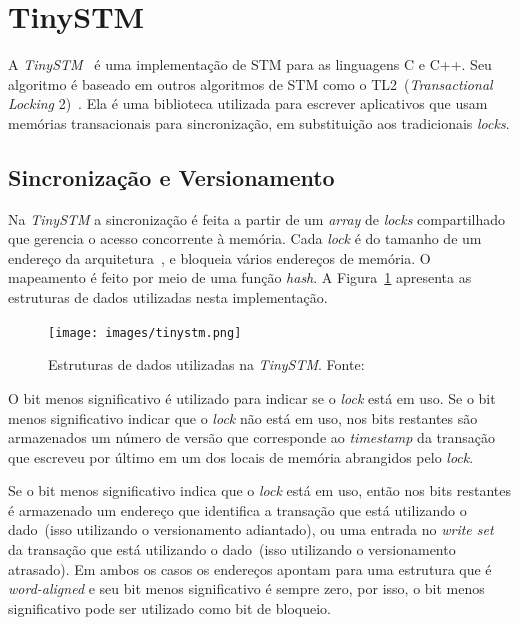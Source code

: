 \documentclass[diss,capa]{texufpel}
\begin{document}
\section{TinySTM}

A \emph{TinySTM}~\cite{TINY} é uma implementação de STM para as linguagens C e C++. Seu algoritmo é baseado em outros algoritmos de STM como o TL2~(\emph{Transactional Locking} 2)~\cite{tl2}. Ela é uma biblioteca utilizada para escrever aplicativos que usam memórias transacionais para sincronização, em substituição aos tradicionais \emph{locks}.

\subsection{Sincronização e Versionamento}

Na \emph{TinySTM} a sincronização é feita a partir de um \emph{array} de \emph{locks} compartilhado que gerencia o acesso concorrente à memória. Cada \emph{lock} é do tamanho de um endereço da arquitetura~\cite{TINY}, e bloqueia vários endereços de memória. O mapeamento é feito por meio de uma função \emph{hash}. A Figura~\ref{figurasincronisacaotinystm} apresenta as estruturas de dados utilizadas nesta implementação.


\begin{figure}[!htp]
\centering
\texttt{[image: images/tinystm.png]}
\caption{Estruturas de dados utilizadas na \emph{TinySTM}. Fonte:~\cite{TINY}}
\label{figurasincronisacaotinystm}
\end{figure}

O bit menos significativo é utilizado para indicar se o \emph{lock} está em uso. Se o bit menos significativo indicar que o \emph{lock} não está em uso, nos bits restantes são armazenados um número de versão que corresponde ao \emph{timestamp} da transação que escreveu por último em um dos locais de memória abrangidos pelo \emph{lock}.

Se o bit menos significativo indica que o \emph{lock} está em uso, então nos bits restantes é armazenado um endereço que identifica a transação que está utilizando o dado~(isso utilizando o versionamento adiantado), ou uma entrada no \emph{write set} da transação que está utilizando o dado~(isso utilizando o versionamento atrasado). Em ambos os casos os endereços apontam para uma estrutura que é \emph{word-aligned} e seu bit menos significativo é sempre zero, por isso, o bit menos significativo pode ser utilizado como bit de bloqueio.
\end{document}
